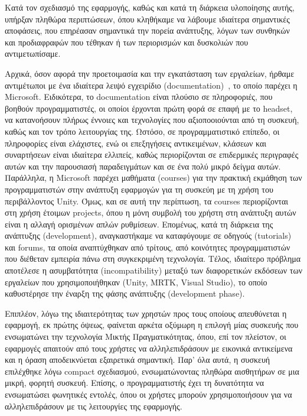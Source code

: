 Κατά τον σχεδιασμό της εφαρμογής, καθώς και κατά τη διάρκεια υλοποίησης αυτής, υπήρξαν πληθώρα περιπτώσεων, όπου κληθήκαμε να λάβουμε ιδιαίτερα σημαντικές αποφάσεις, που επηρέασαν σημαντικά την πορεία ανάπτυξης, λόγων των συνθηκών και προδιαφραφών που τέθηκαν ή των περιορισμών και δυσκολιών που αντιμετωπίσαμε.

Αρχικά, όσον αφορά την προετοιμασία και την εγκατάσταση των εργαλείων, ήρθαμε αντιμέτωποι με ένα ιδιαίτερα λειψό εγχειρίδιο (documentation)~\cite{hferrone_mixed}, το οποίο παρέχει η Microsoft.
Ειδικότερα, το documentation είναι πλούσιο σε πληροφοριές, που βοηθούν προγραμματιστές, οι οποίοι έρχονται πρώτη φορά σε επαφή με το headset, να κατανοήσουν πλήρως έννοιες και τεχνολογίες που αξιοποοιούνται από τη συσκευή, καθώς και τον τρόπο λειτουργίας της. Ωστόσο, σε προγραμματιστικό επίπεδο, οι πληροφορίες είναι ελάχιστες, ενώ οι επεξηγήσεις αντικειμένων, κλάσεων και συναρτήσεων είναι ιδιαίτερα ελλιπείς, καθώς περιορίζονται σε επιδερμικές περιγραφές αυτών και την παρουσιασή παραδειγμάτων και σε ένα πολύ μικρό δείγμα αυτών.
Παράλληλα, η Microsoft παρέχει μαθήματα (courses) για την πρακτική εκμάθηση των προγραμματιστών στην ανάπτυξη εφαρμογών για τη συσκεύη με τη χρήση του περιβάλλοντος Unity. Όμως, και σε αυτή την περίπτωση, τα courses περιορίζονται στη χρήση έτοιμων projects, όπου η μόνη συμβολή του χρήστη στη ανάπτυξη αυτών είναι η αλλαγή ορισμένων απλών ρυθμίσεων. Επομένως, κατά τη διάρκεια της ανάπτυξης (development), αναγκαστήκαμε να καταφύγουμε σε οδηγούς (tutorials) και forums, τα οποία αναπτύχθηκαν από τρίτους, από κοινότητες προγραμματιστών που διέθεταν εμπειρία πάνω στη συγκεκριμένη τεχνολογία.
Τέλος, ιδιαίτερο πρόβλημα αποτέλεσε η ασυμβατότητα (incompatibility) μεταξύ των διαφορετικών εκδόσεων των εργαλείων που χρησιμοποιήθηκαν (Unity, MRTK, Visual Studio), το οποίο καθυστέρησε την έναρξη της φάσης ανάπτυξης (development phase).

Επιπλέον, λόγω της ιδιαιτερότητας των χρηστών προς τους οποίους απευθύνεται η εφαρμογή, εκ πρώτης όψεως, φαίνεται αρκέτα οξύμωρη η επιλογή μίας συσκευής που ενσωματώνει την τεχνολογία Μικτής Πραγματικότητας, όπου, επί τον πλείστον, οι εφαρμογές απαιτούν από τους χρήστες να αλληλεπιδράσουν με εικονικά αντικείμενα και η όραση αποδεικνύεται εξαιρετικά σημαντική. Παρ' όλα αυτά, η συσκευή επιλέχθηκε λόγω compact σχεδιασμού, ενσωματώνοντας πληθώρα αισθητήρων σε μια μικρή, φορητή συσκευή. Επίσης, ο προγραμματιστής έχει τη δυνατότητα να ενσωματώσει φωνητικές εντολές, όπου οι χρήστες μπορούν χρησιμοποιήσουν για να αλληλεπιδράσουν με τις λειτουργίες της εφαρμογής.

